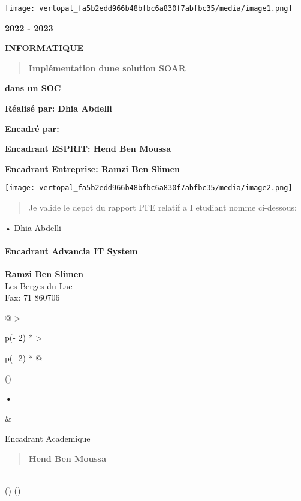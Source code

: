 \documentclass[
]{article}
\author{}
\date{}
\begin{document}
\texttt{[image: vertopal\_fa5b2edd966b48bfbc6a830f7abfbc35/media/image1.png]}

\textbf{2022 - 2023}

\textbf{INFORMATIQUE}

\begin{quote}
\textbf{Implémentation d\textquotesingle une solution SOAR}
\end{quote}

\textbf{dans un SOC}

\textbf{Réalisé par: Dhia Abdelli}

\textbf{Encadré par:}

\textbf{Encadrant ESPRIT: Hend Ben Moussa}

\textbf{Encadrant Entreprise: Ramzi Ben Slimen}

\texttt{[image: vertopal\_fa5b2edd966b48bfbc6a830f7abfbc35/media/image2.png]}

\begin{quote}
Je valide le depot du rapport PFE relatif a I\textquotesingle{} etudiant
nomme ci-dessous:
\end{quote}

\noindent •\; Dhia Abdelli

\paragraph{Encadrant Advancia IT System}
\textbf{Ramzi Ben Slimen}\\
Les Berges du Lac\\
Fax: 71 860706

\begin{longtable}[]{@{}
  >{\raggedright\arraybackslash}p{(\columnwidth - 2\tabcolsep) * }
  >{\raggedright\arraybackslash}p{(\columnwidth - 2\tabcolsep) * }@{}}
\toprule()
\begin{minipage}[b]{\linewidth}\raggedright
\textbf{•}
\end{minipage} & \begin{minipage}[b]{\linewidth}\raggedright
Encadrant Academique

\begin{quote}
\textbf{Hend Ben Moussa}
\end{quote}
\end{minipage} \\
\midrule()
\endhead
\bottomrule()
\end{longtable}
\end{document}
